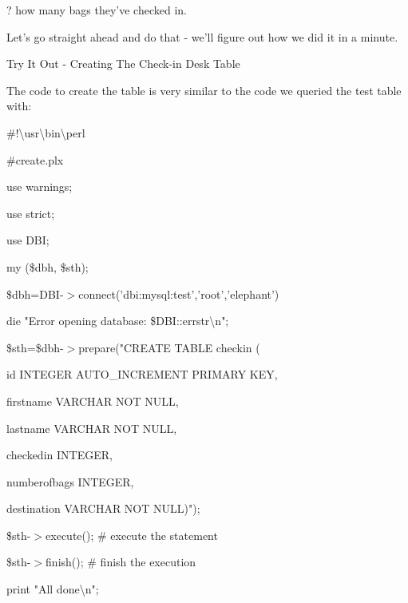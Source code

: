 \documentclass[a4paper,11pt]{book}
\begin{document}
\noindent 

\noindent ? how many bags they've checked in.

\noindent 

\noindent Let's go straight ahead and do that - we'll figure out how we did it in a minute.

\noindent 

\noindent Try It Out - Creating The Check-in Desk Table

\noindent 

\noindent The code to create the table is very similar to the code we queried the test table with:

\noindent 

\noindent \#!\textbackslash usr\textbackslash bin\textbackslash perl

\noindent \#create.plx

\noindent 

\noindent use warnings;

\noindent use strict;

\noindent use DBI;

\noindent 

\noindent my (\$dbh, \$sth);

\noindent 

\noindent \$dbh=DBI-$>$connect('dbi:mysql:test','root','elephant') \textbar \textbar 

\noindent die "Error opening database: \$DBI::errstr\textbackslash n";

\noindent 

\noindent \$sth=\$dbh-$>$prepare("CREATE TABLE checkin (

\noindent id INTEGER AUTO\_INCREMENT PRIMARY KEY,

\noindent firstname VARCHAR NOT NULL,

\noindent lastname VARCHAR NOT NULL,

\noindent checkedin INTEGER,

\noindent numberofbags INTEGER,

\noindent destination VARCHAR NOT NULL)");

\noindent 

\noindent 

\noindent \$sth-$>$execute(); \# execute the statement

\noindent 

\noindent \$sth-$>$finish(); \# finish the execution

\noindent print "All done\textbackslash n";
\end{document}
